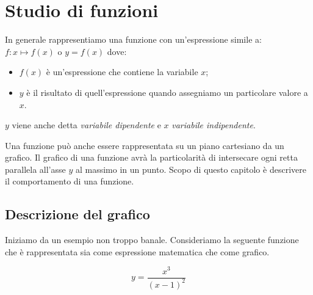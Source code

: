 


% 

\chapter{Studio di funzioni}

In generale rappresentiamo una funzione con un'espressione simile 
a:~\(f: x \mapsto f(x)\) o \(y = f(x)\) dove:
\begin{itemize} [nosep]
 \item \(f(x)\) è un'espressione che contiene la variabile \(x\);
 \item \(y\) è il risultato di quell'espressione quando assegniamo un 
particolare valore a \(x\). 
\end{itemize}

\vspace{-.5em}
\begin{center}
\textbf{\(y\)} viene anche detta \emph{variabile dipendente} e 
\textbf{\(x\)} \emph{variabile indipendente}.
\end{center}
\vspace{-.5em}

Una funzione può anche essere rappresentata su un piano cartesiano da un 
grafico. 
Il grafico di una funzione avrà la particolarità di intersecare ogni retta 
parallela all'asse \(y\) al massimo in un punto.
Scopo di questo capitolo è descrivere il comportamento di una funzione.

\section{Descrizione del grafico}
\label{sec:descrizione_grafico}
Iniziamo da un esempio non troppo banale. 
Consideriamo la seguente funzione che è rappresentata sia come espressione 
matematica che come grafico.

\begin{minipage}{.20\linewidth}
\[y=\frac{x^3}{(x-1)^2}\]
\end{minipage}
\hfill
\begin{minipage}{.78\linewidth}
 \begin{center}
 \scalebox{.8}{\funzionea}
 \end{center}
\end{minipage}
\vspace{.5em}


